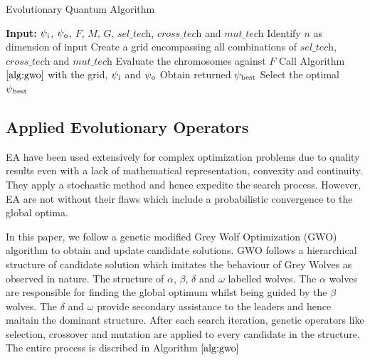 \documentclass[conference]{IEEEtran}
\begin{document}
\begin{algorithm}[!b]
\footnotesize
\caption{Evolutionary Quantum Algorithm}
\label{alg:eq}
\begin{algorithmic}[1]
\STATE \textbf{Input:} $\psi\textsubscript{i}$, $\psi\textsubscript{o}$, $\textit{F}$, $\textit{M}$, $\textit{G}$, $\textit{sel\_tech}$, $\textit{cross\_tech}$ and $\textit{mut\_tech}$
\STATE Identify $\textit{n}$ as dimension of input
\STATE Create a grid encompassing all combinations of $\textit{sel\_tech}$, $\textit{cross\_tech}$ and $\textit{mut\_tech}$
\STATE Evaluate the chromosomes against $\textit{F}$
\STATE Call Algorithm $\ref{alg:gwo}$ with the grid, $\psi\textsubscript{i}$ and $\psi\textsubscript{o}$ 
\STATE Obtain returned $\psi\textsubscript{best}$
\ENDFOR
\STATE Select the optimal $\psi\textsubscript{best}$
\end{algorithmic}
\end{algorithm}

\subsection{Applied Evolutionary Operators}

EA have been used extensively for complex optimization problems due to quality results even with a lack of mathematical representation, convexity and continuity. They apply a stochastic method and hence expedite the search process. However, EA are not without their flaws which include a probabilistic convergence to the global optima. 

In this paper, we follow a genetic modified Grey Wolf Optimization (GWO) algorithm \cite{gwo} to obtain and update candidate solutions. GWO follows a hierarchical structure of candidate solution which imitates the behaviour of Grey Wolves as observed in nature. The structure of $\alpha$, $\beta$, $\delta$ and $\omega$ labelled wolves. The $\alpha$ wolves are responsible for finding the global optimum whilst being guided by the $\beta$ wolves. The $\delta$ and $\omega$ provide secondary assistance to the leaders and hence maitain the dominant structure. After each search iteration, genetic operators like selection, crossover and mutation are applied to every candidate in the structure. The entire process is discribed in Algorithm $\ref{alg:gwo}$
\end{document}
